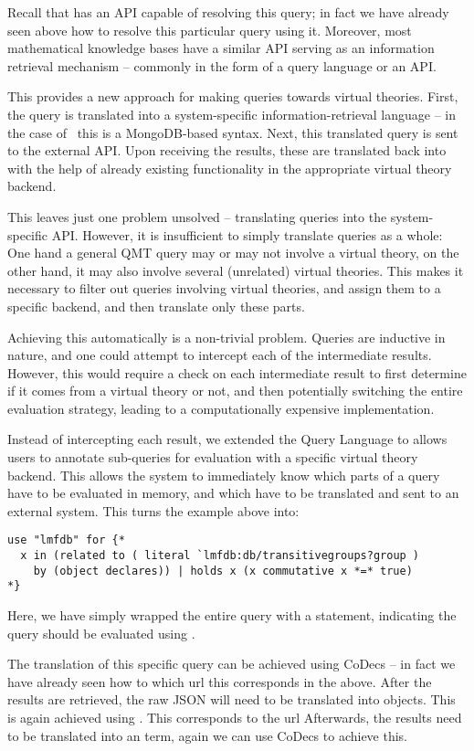 Recall that \lmfdb has an API capable of resolving this query; in fact we have already seen above how to resolve this particular query using it. 
Moreover, most mathematical knowledge bases have a similar API serving as an information retrieval mechanism -- commonly in the form of a query language or an API. 

This provides a new approach for making queries towards virtual theories. 
First, the \mmt query is translated into a system-specific information-retrieval language -- in the case of \lmfdb\ this is a MongoDB-based syntax.
Next, this translated query is sent to the external API. 
Upon receiving the results, these are translated back into \ommt with the help of already existing functionality in the appropriate virtual theory backend.

This leaves just one problem unsolved -- translating queries into the system-specific API. 
However, it is insufficient to simply translate queries as a whole: 
One hand a general QMT query may or may not involve a virtual theory, on the other hand, it may also involve several (unrelated) virtual theories. 
This makes it necessary to filter out queries involving virtual theories, and assign them to a specific backend, and then translate only these parts. 

Achieving this automatically is a non-trivial problem. 
Queries are inductive in nature, and one could attempt to intercept each of the intermediate results. 
However, this would require a check on each intermediate result to first determine if it comes from a virtual theory or not, and then potentially switching the entire evaluation strategy, leading to a computationally expensive implementation. 

Instead of intercepting each result, we extended the Query Language to allows users to annotate sub-queries for evaluation with a specific virtual theory backend. 
This allows the system to immediately know which parts of a query have to be evaluated in \mmt memory, and which have to be translated and sent to an external system. 
This turns the example above into:
\begin{lstlisting}[language=qmt]
use "lmfdb" for {*
  x in (related to ( literal `lmfdb:db/transitivegroups?group ) 
    by (object declares)) | holds x (x commutative x *=* true)
*}
\end{lstlisting}
Here, we have simply wrapped the entire query with a  statement, indicating the query should be evaluated using \lmfdb. 

The translation of this specific query can be achieved using CoDecs -- in fact we have already seen how to which url this corresponds in the above. 
After the results are retrieved, the raw JSON will need to be translated into \ommt objects. 
This is again achieved using \ommt. 
This corresponds to the url 
Afterwards, the results need to be translated into an \ommt term, again we can use CoDecs to achieve this. 

